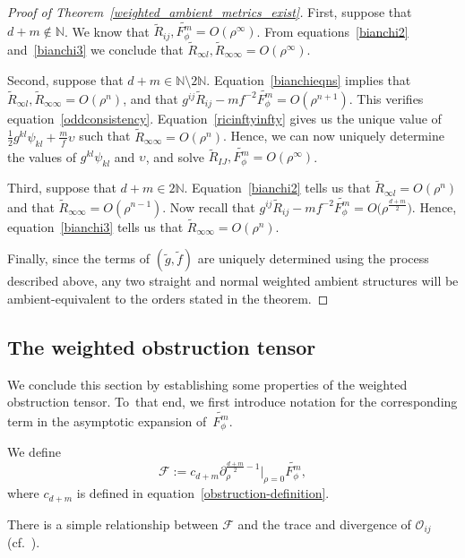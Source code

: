 \documentclass[pdftex]{sigma}
\numberwithin{equation}{section}
\begin{document}
\begin{proof}[Proof of Theorem~\ref{weighted_ambient_metrics_exist}]
First, suppose that $d+m\notin\mathbb{N}$. We know that $\widetilde{R}_{ij},\widetilde{F_\phi^m}=O(\rho^\infty)$. From equations~\eqref{bianchi2} and~\eqref{bianchi3} we conclude that $\widetilde{R}_{\infty l},\widetilde{R}_{\infty\infty}=O(\rho^\infty)$.

Second, suppose that $d+m\in \mathbb{N}\setminus 2\mathbb{N}$. Equation~\eqref{bianchieqns} implies that $\widetilde{R}_{\infty l},\widetilde{R}_{\infty\infty}=O(\rho^{n})$, and that $g^{ij}\widetilde{R}_{ij}-mf^{-2}\widetilde{F_\phi^m}=O(\rho^{n+1})$. This verifies equation~\eqref{oddconsistency}. Equation~\eqref{ricinftyinfty} gives us the unique value of $\frac{1}{2}g^{kl}\psi_{kl}+\frac{m}{f}\upsilon$ such that $\widetilde{R}_{\infty\infty}=O(\rho^{n})$. Hence, we can now uniquely determine the values of $g^{kl}\psi_{kl}$ and $\upsilon$, and solve $\widetilde{R}_{IJ},\widetilde{F_\phi^m}=O(\rho^\infty)$.

Third, suppose that $d+m\in 2\mathbb{N}$. Equation~\eqref{bianchi2} tells us that $\widetilde{R}_{\infty l}=O(\rho^n)$ and that $\widetilde{R}_{\infty\infty}=O(\rho^{n-1})$. Now recall that $g^{ij}\widetilde{R}_{ij}-mf^{-2}\widetilde{F_\phi^m}=O\big(\rho^{\frac{d+m}{2}}\big)$.
Hence, equation~\eqref{bianchi3} tells us that $\widetilde{R}_{\infty\infty}=O(\rho^n)$.

Finally, since the terms of $(\widetilde{g},\widetilde{f})$ are uniquely determined using the process described above, any two straight and normal weighted ambient structures will be ambient-equivalent to the orders stated in the theorem.
\end{proof}

\subsection{The weighted obstruction tensor}
We conclude this section by establishing some properties of the weighted obstruction tensor. To~that end, we first introduce notation for the corresponding term in the asymptotic expansion of~$\widetilde{F_\phi^m}$.
\begin{Definition}
We define
\[
\mathcal{F}:=c_{d+m}\partial_\rho^{\frac{d+m}{2}-1}\big|_{\rho=0}\widetilde{F_\phi^m},
\]
where $c_{d+m}$ is defined in equation~\eqref{obstruction-definition}.
\end{Definition}

There is a simple relationship between $\mathcal{F}$ and the trace and divergence of $\mathcal{O}_{ij}$ (cf.\ \cite{Case2014s}).
\end{document}
